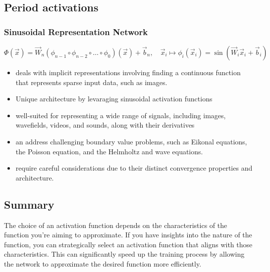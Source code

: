 \documentclass[11pt]{article}
\begin{document}
\subsection{Period activations}

\subsubsection{Sinusoidal Representation Network}

\begin{definition}\label{eq:activation-logsoftmax}
    \begin{equation*}
        \Phi(\vec{x}) = \vec{W}_n(\phi_{n-1}\circ \phi_{n-2} \circ \ldots \circ \phi_{0})(\vec{x}) + \vec{b}_n, \quad \vec{x}_i \mapsto \phi_i(\vec{x}_i) = \sin(\vec{W}_i \vec{x}_i + \vec{b}_i)
    \end{equation*}
\end{definition}

\begin{itemize}
    \item deals with implicit representations involving finding a continuous function that represents sparse input data, such as images.
    \item Unique architecture by levaraging sinusoidal activation functions 
    \item well-suited for representing a wide range of signals, including images, wavefields, videos, and sounds, along with their derivatives
    \item an address challenging boundary value problems, such as Eikonal equations, the Poisson equation, and the Helmholtz and wave equations. 
    \item require careful considerations due to their distinct convergence properties and architecture.
\end{itemize}

\subsection{Summary}

The choice of an activation function depends on the characteristics of the function you're aiming to approximate. If you have insights into the nature of the function, you can strategically select an activation function that aligns with those characteristics. This can significantly speed up the training process by allowing the network to approximate the desired function more efficiently. 
\end{document}
